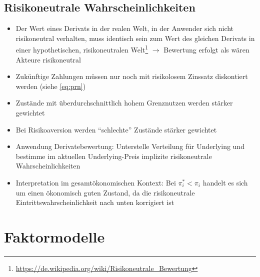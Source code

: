 \subsection{Risikoneutrale Wahrscheinlichkeiten}
\begin{itemize}
	\item Der Wert eines Derivats in der realen Welt, in der Anwender sich nicht risikoneutral verhalten, muss identisch sein zum Wert des gleichen Derivats in einer hypothetischen, risikoneutralen Welt\footnote{\url{https://de.wikipedia.org/wiki/Risikoneutrale_Bewertung}} \(\rightarrow\) Bewertung erfolgt als wären Akteure risikoneutral
	\item Zukünftige Zahlungen müssen nur noch mit risikolosem Zinssatz diskontiert werden (siehe \ref{eq:prn})
	\item Zustände mit überdurchschnittlich hohem Grenznutzen werden stärker gewichtet
	\item Bei Risikoaversion werden "`schlechte"' Zustände stärker gewichtet
	\item Anwendung Derivatebewertung: Unterstelle Verteilung für Underlying und bestimme im aktuellen Underlying-Preis implizite risikoneutrale Wahrscheinlichkeiten
	\item Interpretation im gesamtökonomischen Kontext: Bei \(\pi^*_i < \pi_i\) handelt es sich um einen ökonomisch guten Zustand, da die risikoneutrale Eintrittswahrscheinlichkeit nach unten korrigiert ist
\end{itemize}



\section{Faktormodelle}

